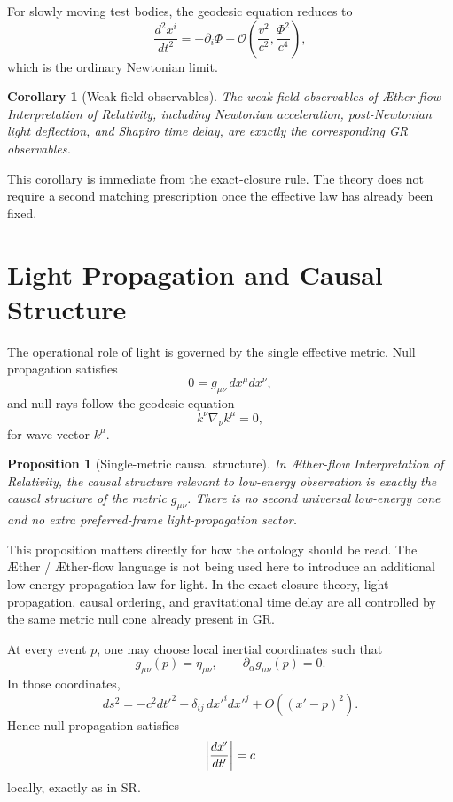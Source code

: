 \documentclass[11pt]{article}
\newcommand{\Aether}{\AE{}ther}
\newcommand{\Aflow}{\AE{}ther-flow}
\newcommand{\TheoryName}{\Aflow{} Interpretation of Relativity}
\newtheorem{proposition}{Proposition}
\newtheorem{corollary}{Corollary}
\begin{document}
For slowly moving test bodies, the geodesic equation reduces to
\begin{equation}
\frac{d^2x^i}{dt^2}
=
-\partial_i\Phi
+ \mathcal{O}\!\left(\frac{v^2}{c^2},\frac{\Phi^2}{c^4}\right),
\label{eq:newtonianlimit}
\end{equation}
which is the ordinary Newtonian limit.

\begin{corollary}[Weak-field observables]
The weak-field observables of \TheoryName{}, including Newtonian acceleration, post-Newtonian light deflection, and Shapiro time delay, are exactly the corresponding GR observables.
\end{corollary}

This corollary is immediate from the exact-closure rule. The theory does not require a second matching prescription once the effective law has already been fixed.

\section{Light Propagation and Causal Structure}

The operational role of light is governed by the single effective metric. Null propagation satisfies
\begin{equation}
0=g_{\mu\nu}\,dx^\mu dx^\nu,
\label{eq:null}
\end{equation}
and null rays follow the geodesic equation
\begin{equation}
k^\nu \nabla_\nu k^\mu = 0,
\label{eq:nullgeodesic}
\end{equation}
for wave-vector \(k^\mu\).

\begin{proposition}[Single-metric causal structure]
In \TheoryName{}, the causal structure relevant to low-energy observation is exactly the causal structure of the metric \(g_{\mu\nu}\). There is no second universal low-energy cone and no extra preferred-frame light-propagation sector.
\end{proposition}

This proposition matters directly for how the ontology should be read. The \Aether{} / \Aflow{} language is not being used here to introduce an additional low-energy propagation law for light. In the exact-closure theory, light propagation, causal ordering, and gravitational time delay are all controlled by the same metric null cone already present in GR.

At every event \(p\), one may choose local inertial coordinates such that
\begin{equation}
g_{\mu\nu}(p)=\eta_{\mu\nu},
\qquad
\partial_\alpha g_{\mu\nu}(p)=0.
\label{eq:localinertial}
\end{equation}
In those coordinates,
\begin{equation}
ds^2
=
-c^2dt'^2+\delta_{ij}\,dx'^i dx'^j + O((x'-p)^2).
\label{eq:localminkowski}
\end{equation}
Hence null propagation satisfies
\begin{equation}
\abs{\frac{d\vec x'}{dt'}}=c
\label{eq:localc}
\end{equation}
locally, exactly as in SR.
\end{document}
